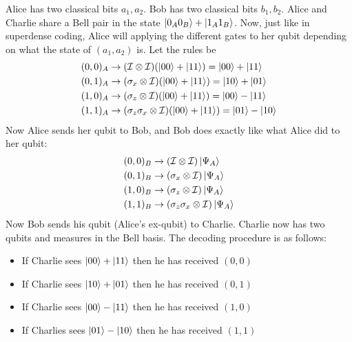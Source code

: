 \documentclass{article}
\theoremstyle{definition}
\newcommand{\Id}{\mathcal{I}}
\begin{document}
\noindent Alice has two classical bits $a_1,a_2$. Bob has two classical bits $b_1,b_2$. Alice and Charlie share a Bell pair in the state $\ket{0_A0_B} + \ket{1_A1_B}$. Now, just like in superdense coding, Alice will applying the different gates to her qubit depending on what the state of $(a_1,a_2)$ is. Let the rules be 
\begin{align*}
	&(0,0)_A \to (\Id \otimes \Id)( \ket{00} + \ket{11}) = \ket{00} + \ket{11} \\
	&(0,1)_A \to (\sigma_x \otimes \Id)( \ket{00} + \ket{11}) = \ket{10} + \ket{01} \\ 
	&(1,0)_A \to (\sigma_z \otimes \Id)( \ket{00} + \ket{11}) = \ket{00} - \ket{11} \\ 
	&(1,1)_A \to (\sigma_z \sigma_x \otimes \Id)( \ket{00} + \ket{11}) = \ket{01} - \ket{10}
\end{align*}
Now Alice sends her qubit to Bob, and Bob does exactly like what Alice did to her qubit:
\begin{align*}
	&(0,0)_B \to (\Id \otimes \Id)\ket{\Psi_A}  \\
	&(0,1)_B \to (\sigma_x \otimes \Id) \ket{\Psi_A} \\ 
	&(1,0)_B \to (\sigma_z \otimes \Id) \ket{\Psi_A} \\ 
	&(1,1)_B \to (\sigma_z \sigma_x \otimes \Id) \ket{\Psi_A}  
\end{align*}
Now Bob sends his qubit (Alice's ex-qubit) to Charlie.  Charlie now has two qubits and measures in the Bell basis. The decoding procedure is as follows:
\begin{itemize}
	\item If Charlie sees $\ket{00} + \ket{11}$ then he has received $(0,0)$ 
	
	\item If Charlie sees $\ket{10} + \ket{01}$ then he has received $(0,1)$
	
	\item If Charlie sees $\ket{00} - \ket{11}$ then he has received $(1,0)$
	
	\item If Charlies sees $\ket{01} - \ket{10}$ then he has received $(1,1)$
\end{itemize}
\end{document}
